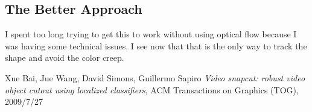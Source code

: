 \documentclass[12pt]{article}
\begin{document}
\subsection{The Better Approach}

I spent too long trying to get this to work without using optical flow because I was having some technical issues. I see now that that is the only way to track the shape and avoid the color creep. 

\begin{thebibliography}{9}

  Xue Bai, Jue Wang, David Simons, Guillermo Sapiro
  \emph{Video snapcut: robust video object cutout using localized classifiers},
  ACM Transactions on Graphics (TOG),
  2009/7/27

\end{thebibliography}
\end{document}
